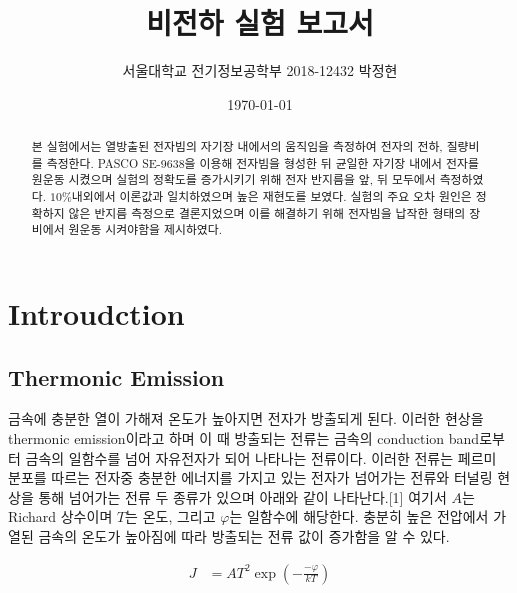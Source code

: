 \documentclass[%
 reprint,
 amsmath,amssymb,
 aps,
]{revtex4-2}
\begin{document}
\title{비전하 실험 보고서}

\author{서울대학교 전기정보공학부 2018-12432 박정현}
\date{\today}%

\begin{abstract}
본 실험에서는 열방출된 전자빔의 자기장 내에서의 움직임을 측정하여 전자의 전하, 질량비를 측정한다. PASCO SE-9638을 이용해 전자빔을 형성한 뒤 균일한 자기장 내에서 전자를 원운동 시켰으며 실험의 정확도를 증가시키기 위해 전자 반지름을 앞, 뒤 모두에서 측정하였다. $10\%$내외에서 이론값과 일치하였으며 높은 재현도를 보였다. 실험의 주요 오차 원인은 정확하지 않은 반지름 측정으로 결론지었으며 이를 해결하기 위해 전자빔을 납작한 형태의 장비에서 원운동 시켜야함을 제시하였다.
\end{abstract}

\maketitle


\section{\label{sec:level1}Introudction}
\subsection{\label{sec:level2}Thermonic Emission}
금속에 충분한 열이 가해져 온도가 높아지면 전자가 방출되게 된다. 이러한 현상을 thermonic emission이라고 하며 이 때 방출되는 전류는 금속의 conduction band로부터 금속의 일함수를 넘어 자유전자가 되어 나타나는 전류이다. 이러한 전류는 페르미 분포를 따르는 전자중 충분한 에너지를 가지고 있는 전자가 넘어가는 전류와 터널링 현상을 통해 넘어가는 전류 두 종류가 있으며 아래와 같이 나타난다.[1] 여기서 $A$는 Richard 상수이며 $T$는 온도, 그리고 $\varphi$는 일함수에 해당한다. 충분히 높은 전압에서 가열된 금속의 온도가 높아짐에 따라 방출되는 전류 값이 증가함을 알 수 있다.

\begin{align}
	J &= AT^{2}\exp\left(-\frac{-\varphi}{kT}\right)
\end{align}
\end{document}
